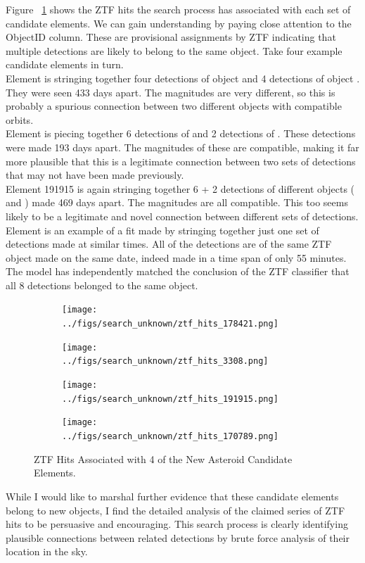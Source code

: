 Figure ~\ref{fig:ZtfHits} shows the ZTF hits the search process has associated with each set of candidate elements.
We can gain understanding by paying close attention to the ObjectID column.
These are provisional assignments by ZTF indicating that multiple detections are likely to belong to the same object.
Take four example candidate elements in turn.  \\
Element  is stringing together four detections of object  and 4 detections of object .
They were seen 433 days apart.  
The magnitudes are very different, so this is probably a spurious connection between two different objects with compatible orbits.\\
Element  is piecing together 6 detections of  and 2 detections of .
These detections were made 193 days apart.
The magnitudes of these are compatible, making it far more plausible that this is a legitimate connection between 
two sets of detections that may not have been made previously. \\
Element 191915 is again stringing together 6 + 2 detections of different objects ( and )
made 469 days apart.  The magnitudes are all compatible.  
This too seems likely to be a legitimate and novel connection between different sets of detections. \\
Element  is an example of a fit made by stringing together just one set of detections
made at similar times.  All of the detections are of the same ZTF object  made on the same date,
indeed made in a time span of only 55 minutes.
The model has independently matched the conclusion of the ZTF classifier that all 8 detections belonged to the same object.
\begin{figure}[h]
\begin{subfigure}[t]{0.45\textwidth}
\centering
\texttt{[image: ../figs/search\_unknown/ztf\_hits\_178421.png]}
\end{subfigure}
\hfill
\begin{subfigure}[t]{0.45\textwidth}
\centering
\texttt{[image: ../figs/search\_unknown/ztf\_hits\_3308.png]}
\end{subfigure}
\bigskip
\begin{subfigure}[t]{0.45\textwidth}
\centering
\texttt{[image: ../figs/search\_unknown/ztf\_hits\_191915.png]}
\end{subfigure}
\hfill
\begin{subfigure}[t]{0.45\textwidth}
\centering
\texttt{[image: ../figs/search\_unknown/ztf\_hits\_170789.png]}
\end{subfigure}
\caption[ZTF Hits Associated with 4 of the New Asteroid Candidate Elements]
{ZTF Hits Associated with 4 of the New Asteroid Candidate Elements.}
\label{fig:ZtfHits}
\end{figure}
While I would like to marshal further evidence that these candidate elements belong to new objects,
I find the detailed analysis of the claimed series of ZTF hits to be persuasive and encouraging.
This search process is clearly identifying plausible connections between related detections 
by brute force analysis of their location in the sky.

